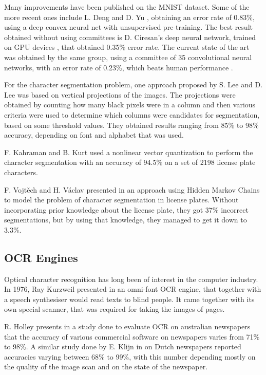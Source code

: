 Many improvements have been published on the MNIST dataset. Some of the more recent ones include L. Deng and D. Yu \cite{deng2011deep}, obtaining an error rate of 0.83\%, using a deep convex neural net with unsupervised pre-training. The best result obtained without using committees is D. Ciresan's deep neural network, trained on GPU devices \cite{Cire_an_2010}, that obtained 0.35\% error rate. The current state of the art was obtained by the same group, using a committee of 35 convolutional neural networks, with an error rate of 0.23\%, which beats human performance \cite{2012arXiv1202.2745C}. 

For the character segmentation problem, one approach proposed by S. Lee and D. Lee \cite{Dong_June_Lee} was based on vertical projections of the images. The projections were obtained by counting how many black pixels were in a column and then various criteria were used to determine which columns were candidates for segmentation, based on some threshold values. They obtained results ranging from 85\% to 98\% accuracy, depending on font and alphabet that was used. 

F. Kahraman and B. Kurt used a nonlinear vector quantization to perform the character segmentation \cite{kahraman2003license} with an accuracy of 94.5\% on a set of 2198 license plate characters. 

F. Vojt{\v{e}}ch and H. V{\'{a}}clav presented in \cite{Franc_2005} an approach using Hidden Markov Chains to model the problem of character segmentation in license plates. Without incorporating prior knowledge about the license plate, they got 37\% incorrect segmentations, but by using that knowledge, they managed to get it down to 3.3\%.

\subsection{OCR Engines}
Optical character recognition has long been of interest in the computer industry. In 1976, Ray Kurzweil presented in \cite{schantz1982history} an omni-font OCR engine, that together with a speech synthesiser would read texts to blind people. It came together with its own special scanner, that was required for taking the images of pages. 

R. Holley presents in a study \cite{Holley_2009} done to evaluate OCR on australian newspapers that the accuracy of various commercial software on newspapers varies from 71\% to 98\%. A similar study done by E. Klijn in \cite{klijn2008current} on Dutch newspapers reported accuracies varying between 68\% to 99\%, with this number depending mostly on the quality of the image scan and on the state of the newspaper. 

